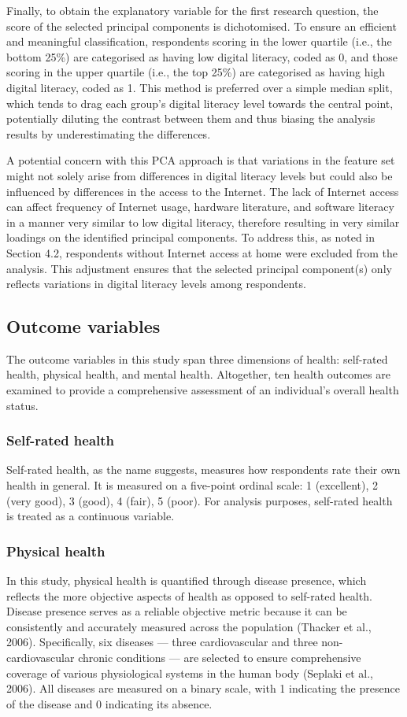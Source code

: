 Finally, to obtain the explanatory variable for the first research question, the score of the selected principal components is dichotomised. To ensure an efficient and meaningful classification, respondents scoring in the lower quartile (i.e., the bottom 25\%) are categorised as having low digital literacy, coded as 0, and those scoring in the upper quartile (i.e., the top 25\%) are categorised as having high digital literacy, coded as 1. This method is preferred over a simple median split, which tends to drag each group's digital literacy level towards the central point, potentially diluting the contrast between them and thus biasing the analysis results by underestimating the differences.

A potential concern with this PCA approach is that variations in the feature set might not solely arise from differences in digital literacy levels but could also be influenced by differences in the access to the Internet. The lack of Internet access can affect frequency of Internet usage, hardware literature, and software literacy in a manner very similar to low digital literacy, therefore resulting in very similar loadings on the identified principal components. To address this, as noted in Section 4.2, respondents without Internet access at home were excluded from the analysis. This adjustment ensures that the selected principal component(s) only reflects variations in digital literacy levels among respondents.


\subsection{Outcome variables}
The outcome variables in this study span three dimensions of health: self-rated health, physical health, and mental health. Altogether, ten health outcomes are examined to provide a comprehensive assessment of an individual's overall health status.

\subsubsection{Self-rated health}
Self-rated health, as the name suggests, measures how respondents rate their own health in general. It is measured on a five-point ordinal scale: 1 (excellent), 2 (very good), 3 (good), 4 (fair), 5 (poor). For analysis purposes, self-rated health is treated as a continuous variable.

\subsubsection{Physical health}
In this study, physical health is quantified through disease presence, which reflects the more objective aspects of health as opposed to self-rated health. Disease presence serves as a reliable objective metric because it can be consistently and accurately measured across the population (Thacker et al., 2006). Specifically, six diseases — three cardiovascular and three non-cardiovascular chronic conditions — are selected to ensure comprehensive coverage of various physiological systems in the human body (Seplaki et al., 2006). All diseases are measured on a binary scale, with 1 indicating the presence of the disease and 0 indicating its absence.

